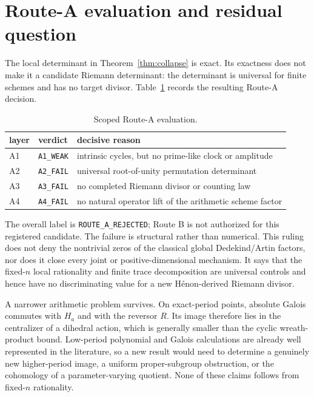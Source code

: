 \section{Route-A evaluation and residual question}

The local determinant in Theorem~\ref{thm:collapse} is exact.  Its exactness
does not make it a candidate Riemann determinant: the determinant is universal
for finite schemes and has no target divisor.  Table~\ref{tab:routea} records
the resulting Route-A decision.

\begin{table}[ht]
\centering
\caption{Scoped Route-A evaluation.}\label{tab:routea}
\begin{tabular}{lll}
\toprule
layer & verdict & decisive reason\\
\midrule
A1 & \texttt{A1\_WEAK} & intrinsic cycles, but no prime-like clock or amplitude\\
A2 & \texttt{A2\_FAIL} & universal root-of-unity permutation determinant\\
A3 & \texttt{A3\_FAIL} & no completed Riemann divisor or counting law\\
A4 & \texttt{A4\_FAIL} & no natural operator lift of the arithmetic scheme factor\\
\bottomrule
\end{tabular}
\end{table}

The overall label is \texttt{ROUTE\_A\_REJECTED}; Route B is not authorized
for this registered candidate.  The failure is structural rather than
numerical.  This ruling does not deny the nontrivial zeros of the classical
global Dedekind/Artin factors, nor does it close every joint or
positive-dimensional mechanism.  It says that the fixed-$n$ local
rationality and finite trace decomposition are universal controls and hence
have no discriminating value for a new H\'enon-derived Riemann divisor.

A narrower arithmetic problem survives.  On exact-period points, absolute
Galois commutes with $H_a$ and with the reversor $R$.  Its image therefore lies
in the centralizer of a dihedral action, which is generally smaller than the
cyclic wreath-product bound.  Low-period polynomial and Galois calculations
are already well represented in the literature, so a new result would need to
determine a genuinely new higher-period image, a uniform proper-subgroup
obstruction, or the cohomology of a parameter-varying quotient.  None of these
claims follows from fixed-$n$ rationality.
